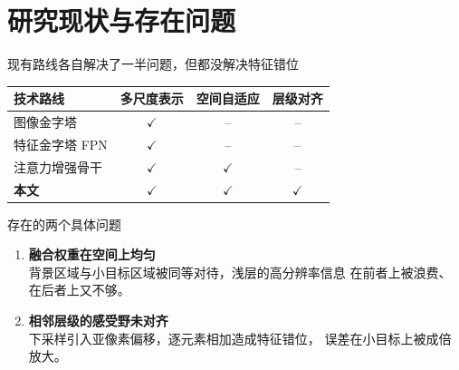 \section{研究现状与存在问题}

\begin{frame}{现有路线各自解决了一半问题，但都没解决特征错位}
  \begin{table}
    \centering\small
    \begin{tabular}{lccc}
      \toprule
      {技术路线} & {多尺度表示} & {空间自适应} & {层级对齐} \\
      \midrule
      图像金字塔        & $\checkmark$ & --         & --         \\
      特征金字塔 FPN    & $\checkmark$ & --         & --         \\
      注意力增强骨干    & $\checkmark$ & $\checkmark$ & --         \\
      \midrule
      \textbf{本文}     & $\checkmark$ & $\checkmark$ & $\checkmark$ \\
      \bottomrule
    \end{tabular}
  \end{table}

\end{frame}

\begin{frame}{存在的两个具体问题}
  \begin{enumerate}
    \setlength{\itemsep}{1.2em}
    \item<1-> \textbf{融合权重在空间上均匀}\\
      {\small 背景区域与小目标区域被同等对待，浅层的高分辨率信息
       在前者上被浪费、在后者上又不够。}
    \item<2-> \textbf{相邻层级的感受野未对齐}\\
      {\small 下采样引入亚像素偏移，逐元素相加造成特征错位，
       误差在小目标上被成倍放大。}
  \end{enumerate}
  \vspace{0.8em}
\end{frame}
